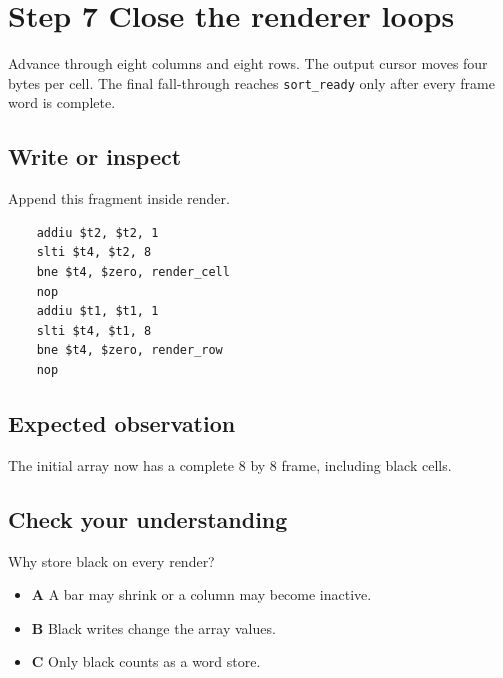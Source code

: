 \section{Step 7 Close the renderer
  loops}\label{009-sorting-visualizer-s07-step-7-close-the-renderer-loops}

Advance through eight columns and eight rows. The output cursor moves
four bytes per cell. The final fall-through reaches \texttt{sort\_ready}
only after every frame word is complete.

\subsection{Write or
  inspect}\label{009-sorting-visualizer-s07-write-or-inspect}

Append this fragment inside render.

\begin{verbatim}
    addiu $t2, $t2, 1
    slti $t4, $t2, 8
    bne $t4, $zero, render_cell
    nop
    addiu $t1, $t1, 1
    slti $t4, $t1, 8
    bne $t4, $zero, render_row
    nop
\end{verbatim}

\subsection{Expected
  observation}\label{009-sorting-visualizer-s07-expected-observation}

The initial array now has a complete 8 by 8 frame, including black
cells.

\subsection{Check your
  understanding}\label{009-sorting-visualizer-s07-check-your-understanding}

Why store black on every render?

\begin{itemize}
  \tightlist
  \item
        \textbf{A} A bar may shrink or a column may become inactive.
  \item
        \textbf{B} Black writes change the array values.
  \item
        \textbf{C} Only black counts as a word store.
\end{itemize}
